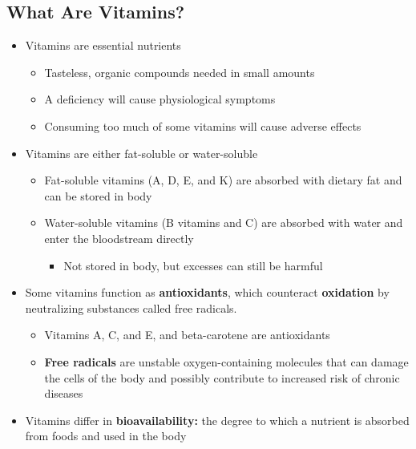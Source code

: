 \documentclass[12pt]{article}
\begin{document}
        \subsection{What Are Vitamins?}
            \begin{itemize}
                \item Vitamins are essential nutrients
                    \begin{itemize}
                        \item Tasteless, organic compounds needed in small amounts
                        \item A deficiency will cause physiological symptoms
                        \item Consuming too much of some vitamins will cause adverse effects
                    \end{itemize}
                \item Vitamins are either fat-soluble or water-soluble
                    \begin{itemize}
                        \item Fat-soluble vitamins (A, D, E, and K) are absorbed with dietary fat and can be stored in body
                        \item Water-soluble vitamins (B vitamins and C) are absorbed with water and enter the bloodstream directly
                            \begin{itemize}
                                \item Not stored in body, but excesses can still be harmful
                            \end{itemize}
                    \end{itemize}
                \item Some vitamins function as \textbf{antioxidants}, which counteract \textbf{oxidation} by neutralizing substances called free radicals.
                    \begin{itemize}
                        \item Vitamins A, C, and E, and beta-carotene are antioxidants
                        \item \textbf{Free radicals} are unstable oxygen-containing molecules that can damage the cells of the body and possibly contribute to increased risk of chronic diseases
                    \end{itemize}
                \item Vitamins differ in \textbf{bioavailability:} the degree to which a nutrient is absorbed from foods and used in the body

\end{itemize}
\end{document}
